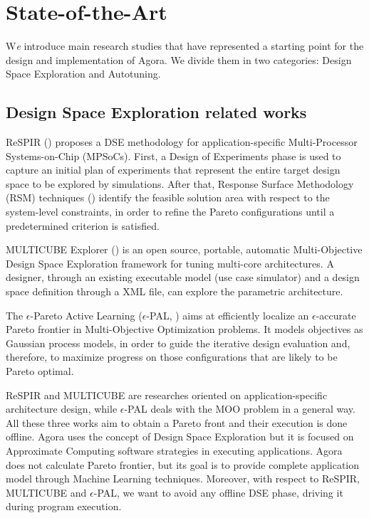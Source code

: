 \chapter{State-of-the-Art}\label{sota}

\lettrine{W}{}\textit{e} introduce main research studies that have represented a starting point for the design and implementation of A\-go\-ra. We divide them in two categories: Design Space Exploration and Autotuning.

\section{Design Space Exploration related works}

ReSPIR (\cite{palermo2009respir}) proposes a DSE methodology for application-spe\-cif\-ic Multi-Processor Systems-on-Chip (MPSoCs). First, a Design of Experiments phase is used to capture an initial plan of experiments that represent the entire target design space to be explored by simulations. After that, Response Surface Methodology (RSM) techniques (\cite{khuri2010response}) identify the feasible solution area with respect to the system-level constraints, in order to refine the Pareto configurations until a predetermined criterion is satisfied.

MULTICUBE Explorer (\cite{silvano2011multicube}) is an open source, portable, automatic Multi-Objective Design Space Exploration framework for tuning multi-core architectures. A designer, through an existing executable model (use case simulator) and a design space definition through a XML file, can explore the parametric architecture.

The $\epsilon$-Pareto Active Learning ($\epsilon$-PAL, \cite{zuluaga2016e}) aims at efficiently localize an $\epsilon$-accurate Pareto frontier in Multi-Objective Optimization problems. It models objectives as Gaussian process models, in order to guide the iterative design evaluation and, therefore, to maximize progress on those configurations that are likely to be Pareto optimal.

ReSPIR and MULTICUBE are researches oriented on ap\-pli\-ca\-tion-specific architecture design, while $\epsilon$-PAL deals with the MOO problem in a general way. All these three works aim to obtain a Pareto front and their execution is done offline. Agora uses the concept of Design Space Exploration but it is focused on Approximate Computing software strategies in executing applications. Agora does not calculate Pareto frontier, but its goal is to provide complete application model through Machine Learning techniques. Moreover, with respect to ReSPIR, MULTICUBE and $\epsilon$-PAL, we want to avoid any offline DSE phase, driving it during program execution.

